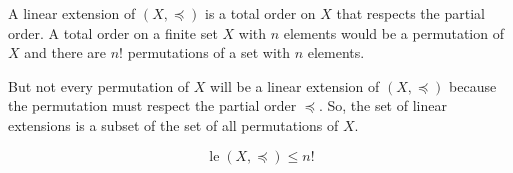 \documentclass{report}
\begin{document}
\begin{proofWithHibiscus}
  A linear extension of $(X, \preceq)$ is  a total order on $X$ that respects the partial order. A total order on a finite set $X$ with $n$ elements would be a permutation of $X$ and there are $n!$ permutations of a set with $n$ elements. 

  But not every permutation of $X$ will be a linear extension of $(X, \preceq)$ because the permutation must respect the partial order $\preceq$. So, the set of linear extensions is a subset of the set of all permutations of $X$.

  \[ \operatorname{le}(X, \preceq) \leq n! \]

\end{proofWithHibiscus}
\end{document}
